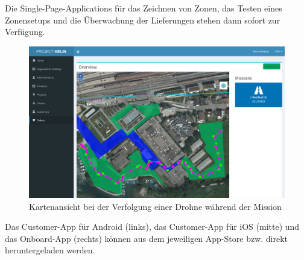 Die \Gls{Single-Page-Applications} für das Zeichnen von Zonen, das Testen eines Zonensetups und die Überwachung der Lieferungen stehen dann sofort zur Verfügung.

\begin{figure}[H]
	\centering
	\includegraphics[width=1.0\textwidth] {images/map-ui.png}
	\caption{Kartenansicht bei der Verfolgung einer Drohne während der Mission}
\end{figure}

\newpage
Das Customer-App für Android (links), das Customer-App für iOS (mitte) und das Onboard-App (rechts) können aus dem jeweiligen App-Store bzw. direkt heruntergeladen werden.


